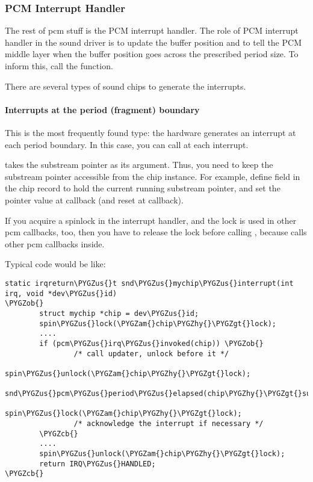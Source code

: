 \documentclass[a4paper,8pt,english]{sphinxmanual}
\def\PYGZus{\char`\_}
\def\PYGZob{\char`\{}
\def\PYGZcb{\char`\}}
\def\PYGZam{\char`\&}
\def\PYGZgt{\char`\>}
\def\PYGZhy{\char`\-}
\begin{document}
\subsubsection{PCM Interrupt Handler}
\label{sound/kernel-api/writing-an-alsa-driver:pcm-interrupt-handler}
The rest of pcm stuff is the PCM interrupt handler. The role of PCM
interrupt handler in the sound driver is to update the buffer position
and to tell the PCM middle layer when the buffer position goes across
the prescribed period size. To inform this, call the
 function.

There are several types of sound chips to generate the interrupts.


\paragraph{Interrupts at the period (fragment) boundary}
\label{sound/kernel-api/writing-an-alsa-driver:interrupts-at-the-period-fragment-boundary}
This is the most frequently found type: the hardware generates an
interrupt at each period boundary. In this case, you can call
 at each interrupt.

 takes the substream pointer as
its argument. Thus, you need to keep the substream pointer accessible
from the chip instance. For example, define  field in the
chip record to hold the current running substream pointer, and set the
pointer value at  callback (and reset at  callback).

If you acquire a spinlock in the interrupt handler, and the lock is used
in other pcm callbacks, too, then you have to release the lock before
calling , because
 calls other pcm callbacks
inside.

Typical code would be like:

\begin{Verbatim}[commandchars=\\\{\}]
static irqreturn\PYGZus{}t snd\PYGZus{}mychip\PYGZus{}interrupt(int irq, void *dev\PYGZus{}id)
\PYGZob{}
        struct mychip *chip = dev\PYGZus{}id;
        spin\PYGZus{}lock(\PYGZam{}chip\PYGZhy{}\PYGZgt{}lock);
        ....
        if (pcm\PYGZus{}irq\PYGZus{}invoked(chip)) \PYGZob{}
                /* call updater, unlock before it */
                spin\PYGZus{}unlock(\PYGZam{}chip\PYGZhy{}\PYGZgt{}lock);
                snd\PYGZus{}pcm\PYGZus{}period\PYGZus{}elapsed(chip\PYGZhy{}\PYGZgt{}substream);
                spin\PYGZus{}lock(\PYGZam{}chip\PYGZhy{}\PYGZgt{}lock);
                /* acknowledge the interrupt if necessary */
        \PYGZcb{}
        ....
        spin\PYGZus{}unlock(\PYGZam{}chip\PYGZhy{}\PYGZgt{}lock);
        return IRQ\PYGZus{}HANDLED;
\PYGZcb{}
\end{Verbatim}
\end{document}
